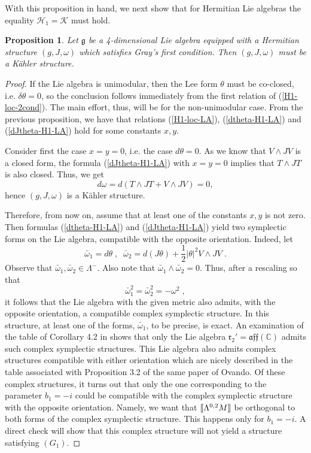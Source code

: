 \documentclass{amsart}
\newtheorem{prop}[theorem]{Proposition}
\newcommand{\La}{\Lambda}
\newcommand{\leftr}{[\hbox{\hspace{-0.15em}}[}
\newcommand{\rightr}{]\hbox{\hspace{-0.15em}}]}
\begin{document}
\noindent
With this proposition in hand, we next show that for Hermitian Lie algebras the equality $\mathcal{H}_1 = \mathcal{K} $ must hold.

\begin{prop} \label{H1=K-LA}
Let $\mathfrak{g}$ be a 4-dimensional Lie algebra equipped with a Hermitian structure $(g,J,\omega)$ which satisfies Gray's first condition. Then $(g,J,\omega)$ must be a K\"ahler structure.     
\end{prop}
\begin{proof} If the Lie algebra is unimodular, then the Lee form $\theta$ must be co-closed, i.e. $\delta \theta = 0$, so the conclusion follows immediately from the first relation of (\ref{H1-loc-2cond}). The main effort, thus, will be for the non-unimodular case. From the previous proposition, we have that relations (\ref{H1-loc-LA}), (\ref{dtheta-H1-LA}) and 
(\ref{dJtheta-H1-LA}) hold for some constants $x, y$. 

Consider first the case $x=y=0$, i.e. the case $d\theta = 0$. As we know that $V \wedge JV$ is a closed form, the formula (\ref{dJtheta-H1-LA}) with $x=y=0$ implies that $T \wedge JT$ is also closed. Thus, we get
$$ d\omega = d(T \wedge JT + V \wedge JV) = 0, $$
hence $(g, J, \omega)$ is a K\"ahler structure. 

Therefore, from now on, assume that at least one of the constants $x, y$ is not zero. Then formulas (\ref{dtheta-H1-LA}) and (\ref{dJtheta-H1-LA}) yield two symplectic forms on the Lie algebra, compatible with the opposite orientation. Indeed, let
$$ \bar{\omega}_1 = d\theta \; , \; \; \bar{\omega}_2 = d(J\theta) + \frac{1}{2} |\theta|^2 V \wedge JV \; .$$
Observe that $\bar{\omega}_1, \bar{\omega}_2 \in \Lambda^-$. Also note that $\bar{\omega}_1 \wedge \bar{\omega}_2 = 0 $. Thus, after a rescaling so that 
$$ \bar{\omega}_1^2 = \bar{\omega}_2^2 = - \omega^2 \; , $$
it follows that the Lie algebra with the given metric also admits, with the opposite orientation, a compatible complex symplectic structure. In this structure, at least one of the forms, $\bar{\omega}_1$, to be precise, is exact. An examination of the table of Corollary 4.2 in \cite{Ov} shows that only the Lie algebra $\mathfrak{r}_2' = \mathfrak{aff}(\mathbb{C})$ admits such complex symplectic structures. This Lie algebra also admits complex structures compatible with either orientation which are nicely described in the table associated with Proposition 3.2 of the same paper \cite{Ov} of Ovando. Of these complex structures, it turns out that only the one corresponding to the parameter $b_1 = -i$ could be compatible with the complex symplectic structure with the opposite orientation. Namely, we want that $\leftr \La^{0,2}M \rightr$ be orthogonal to both forms of the complex symplectic structure. This happens only for $b_1 = -i$. A direct check will show that this complex structure will not yield a structure satisfying $(G_1)$.
\end{proof}
\end{document}
